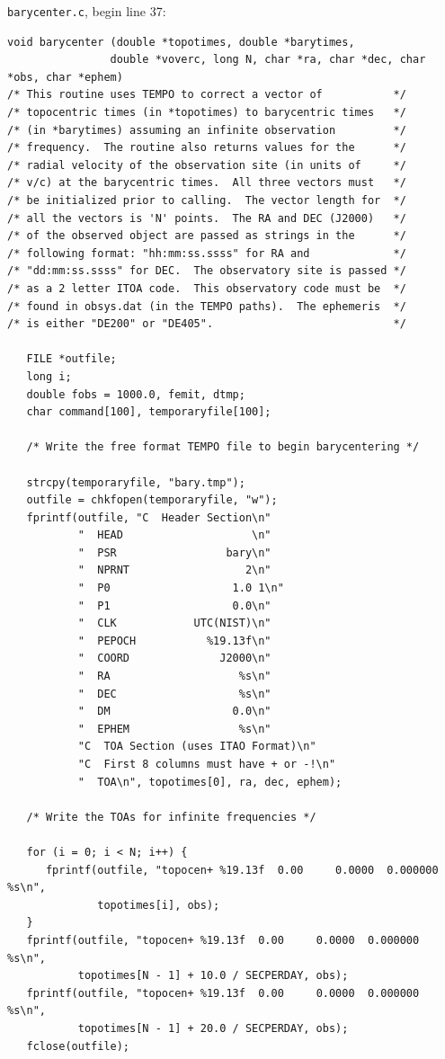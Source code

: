 \documentclass[a4paper,10pt,bibtotoc]{scrartcl}
\begin{document}
\texttt{barycenter.c}, begin line 37:
\begin{verbatim}void barycenter (double *topotimes, double *barytimes,
                double *voverc, long N, char *ra, char *dec, char *obs, char *ephem)
/* This routine uses TEMPO to correct a vector of           */
/* topocentric times (in *topotimes) to barycentric times   */
/* (in *barytimes) assuming an infinite observation         */
/* frequency.  The routine also returns values for the      */
/* radial velocity of the observation site (in units of     */
/* v/c) at the barycentric times.  All three vectors must   */
/* be initialized prior to calling.  The vector length for  */
/* all the vectors is 'N' points.  The RA and DEC (J2000)   */
/* of the observed object are passed as strings in the      */
/* following format: "hh:mm:ss.ssss" for RA and             */
/* "dd:mm:ss.ssss" for DEC.  The observatory site is passed */
/* as a 2 letter ITOA code.  This observatory code must be  */
/* found in obsys.dat (in the TEMPO paths).  The ephemeris  */
/* is either "DE200" or "DE405".                            */

   FILE *outfile;
   long i;
   double fobs = 1000.0, femit, dtmp;
   char command[100], temporaryfile[100];

   /* Write the free format TEMPO file to begin barycentering */

   strcpy(temporaryfile, "bary.tmp");
   outfile = chkfopen(temporaryfile, "w");
   fprintf(outfile, "C  Header Section\n"
           "  HEAD                    \n"
           "  PSR                 bary\n"
           "  NPRNT                  2\n"
           "  P0                   1.0 1\n"
           "  P1                   0.0\n"
           "  CLK            UTC(NIST)\n"
           "  PEPOCH           %19.13f\n"
           "  COORD              J2000\n"
           "  RA                    %s\n"
           "  DEC                   %s\n"
           "  DM                   0.0\n"
           "  EPHEM                 %s\n"
           "C  TOA Section (uses ITAO Format)\n"
           "C  First 8 columns must have + or -!\n"
           "  TOA\n", topotimes[0], ra, dec, ephem);

   /* Write the TOAs for infinite frequencies */

   for (i = 0; i < N; i++) {
      fprintf(outfile, "topocen+ %19.13f  0.00     0.0000  0.000000  %s\n",
              topotimes[i], obs);
   }
   fprintf(outfile, "topocen+ %19.13f  0.00     0.0000  0.000000  %s\n",
           topotimes[N - 1] + 10.0 / SECPERDAY, obs);
   fprintf(outfile, "topocen+ %19.13f  0.00     0.0000  0.000000  %s\n",
           topotimes[N - 1] + 20.0 / SECPERDAY, obs);
   fclose(outfile);


\end{verbatim}
\end{document}
